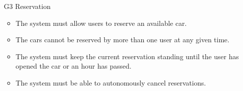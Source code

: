 \begin{itemize}
				\item [G3] Reservation %
					\begin{itemize}
						\item The system must allow users to reserve an available car.
						\item The cars cannot be reserved by more than one user at any given time.
						\item The system must keep the current reservation standing until the user has opened the car or an hour has passed.
						\item The system must be able to autonomously cancel reservations.
					\end{itemize}


\end{itemize}
